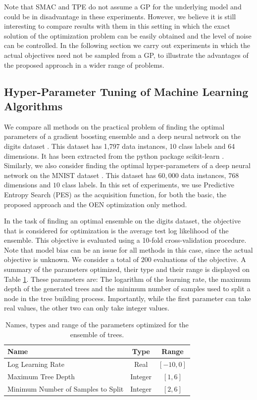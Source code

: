 Note that SMAC and TPE do not assume a GP for the underlying model and could be in disadvantage in these experiments.
However, we believe it is still interesting to compare results with them in this setting in which the exact solution
of the optimization problem can be easily obtained and the level of noise can be controlled. In the following section
we carry out experiments in which the actual objectives need not be sampled from a GP, to illustrate the advantages
of the proposed approach in a wider range of problems.

\subsection{Hyper-Parameter Tuning of Machine Learning Algorithms}

We compare all methods on the practical problem of finding the optimal
parameters of a gradient boosting ensemble and a deep neural network on the digits dataset \citep{friedman2001greedy}.
This dataset has 1,797 data instances, 10 class labels and 64 dimensions. It has been
extracted from the python package scikit-learn \citep{scikit-learn}.
Similarly, we also consider finding the optimal hyper-parameters of a deep neural network on
the MNIST dataset \citep{lecun1998mnist}. This dataset has $60,000$ data instances, $768$ dimensions
and $10$ class labels. In this set of experiments, we use Predictive Entropy Search (PES) as
the acquisition function, for both the basic, the proposed approach and the OEN optimization only method.

In the task of finding an optimal ensemble on the digits dataset, the objective that is considered for
optimization is the average test log likelihood of the ensemble. This objective is evaluated using a 10-fold
cross-validation procedure. Note that model bias can be an issue for all methods in this case, since the actual
objective is unknown.  We consider a total of $200$ evaluations of the objective. A summary of the parameters optimized,
their type and their range is displayed on Table \ref{table:1}. These parameters are: The logarithm of the learning rate,
the maximum depth of the generated trees and the minimum number of samples used to split a node in the
tree building process. Importantly, while the first parameter can take real values, the other two can only take integer values.

\begin{table}[htb]
\centering
\caption{Names, types and range of the parameters optimized for the ensemble of trees.}
\begin{tabular}{ l | c | c }
 \hline
 {\bf Name} & {\bf Type} & {\bf Range} \\
 \hline
 Log Learning Rate & Real & $[-10,0]$ \\
 Maximum Tree Depth & Integer & $[1,6]$ \\
 Minimum Number of Samples to Split & Integer & $[2,6]$ \\
 \hline
\end{tabular}
\label{table:1}
\end{table}

